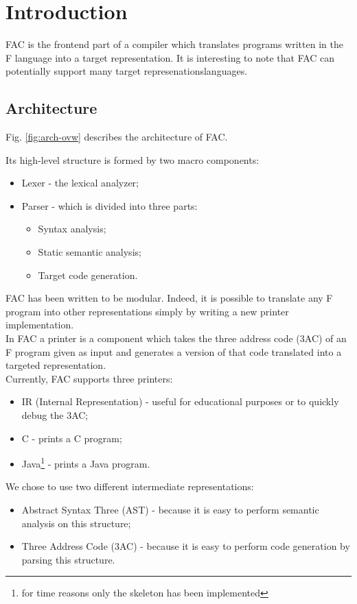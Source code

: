 \section*{Introduction}

FAC is the frontend part of a compiler which translates programs written in the
F language into a target representation. It is interesting to note that FAC can
potentially support many target represenations\/languages.

\subsection*{Architecture}
Fig. \ref{fig:arch-ovw} describes the architecture of FAC.

Its high-level structure is formed by two macro components:
\begin{itemize}
\item Lexer - the lexical analyzer;
\item Parser - which is divided into three parts:
\begin{itemize}
	\item Syntax analysis;
	\item Static semantic analysis;
	\item Target code generation.
\end{itemize}
\end{itemize}

FAC has been written to be modular. Indeed, it is possible to translate any F
program into other representations simply by writing a new printer implementation.
\\
In FAC a printer is a component which takes the three address code (3AC) of an F
program given as input and generates a version of that code translated into a targeted
representation.
\\
Currently, FAC supports three printers:
\begin{itemize}
\item IR (Internal Representation) - useful for educational purposes or to quickly debug the 3AC;
\item C - prints a C program;
\item Java\footnote{for time reasons only the skeleton has been implemented} - prints a Java program.
\end{itemize}

We chose to use two different intermediate representations:
\begin{itemize}
\item Abstract Syntax Three (AST) - because it is easy to perform semantic analysis on this structure;
\item Three Address Code (3AC) - because it is easy to perform code generation by parsing this structure.
\end{itemize}

